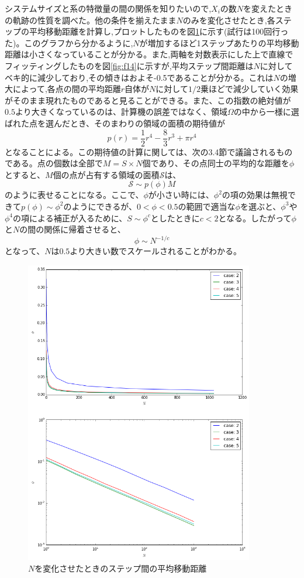 システムサイズと系の特徴量の間の関係を知りたいので,$X_{i}$の数$N$を変えたときの軌跡の性質を調べた。他の条件を揃えたまま$N$のみを変化させたとき,各ステップの平均移動距離を計算し,プロットしたものを図\ref{fig:f13}に示す(試行は100回行った)。このグラフから分かるように,$N$が増加するほど1ステップあたりの平均移動距離は小さくなっていることが分かる。また,両軸を対数表示にした上で直線でフィッティングしたものを図\ref{fig:f14}に示すが,平均ステップ間距離は$N$に対してベキ的に減少しており,その傾きはおよそ-0.5であることが分かる。これは$N$の増大によって,各点の間の平均距離$r$自体が$N$に対して$1/2$乗ほどで減少していく効果がそのまま現れたものであると見ることができる。また、この指数の絶対値が$0.5$より大きくなっているのは、計算機の誤差ではなく、領域$\Omega$の中から一様に選ばれた点を選んだとき、そのまわりの領域の面積の期待値が
\[p(r) = \frac{1}{2}r^{4} - \frac{8}{3}r^{3} + \pi r^{4}\]
となることによる。この期待値の計算に関しては、次の3.4節で議論されるものである。点の個数は全部で$M= S \times N$個であり、その点同士の平均的な距離を$\phi$とすると、$M$個の点が占有する領域の面積$\mathcal{S}$は、
\[\mathcal{S} \sim p(\phi)M\]
のように表せることになる。ここで、$\phi$が小さい時には、$\phi^{2}$の項の効果は無視できて$p(\phi)\sim \phi^{2}$のようにできるが、$0<\phi<0.5$の範囲で適当な$\phi$を選ぶと、$\phi^{3}$や$\phi^{4}$の項による補正が入るために、$S \sim \phi^{c}$としたときに$c<2$となる。したがって$\phi$と$N$の間の関係に帰着させると、
\[\phi \sim N^{-1/c}\]
となって、$N$は$0.5$より大きい数でスケールされることがわかる。
\begin{figure}[H]
    \begin{center}
        \includegraphics[width=10cm]{../img/simple3_N_2.png}
        \caption{$N$を変化させたときのステップ間の平均移動距離}
        \label{fig:f13}
    \end{center}
\end{figure}
